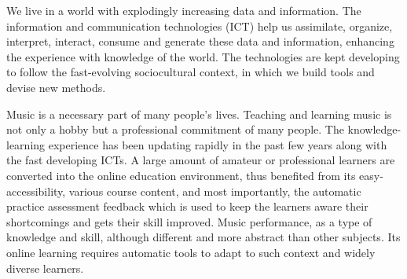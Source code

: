 %
%

\noindent We live in a world with explodingly increasing data and information. The information and communication technologies (ICT) help us assimilate, organize, interpret, interact, consume and generate these data and information, enhancing the experience with knowledge of the world. The technologies are kept developing to follow the fast-evolving sociocultural context, in which we build tools and devise new methods.

Music is a necessary part of many people's lives. Teaching and learning music is not only a hobby but a professional commitment of many people. The knowledge-learning experience has been updating rapidly in the past few years along with the fast developing ICTs. A large amount of amateur or professional learners are converted into the online education environment, thus benefited from its easy-accessibility, various course content, and most importantly, the automatic practice assessment feedback which is used to keep the learners aware their shortcomings and gets their skill improved. Music performance, as a type of knowledge and skill, although different and more abstract than other subjects. Its online learning requires automatic tools to adapt to such context and widely diverse learners.

